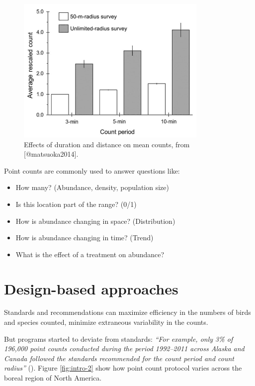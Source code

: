 \documentclass[12pt,]{book}
\providecommand{\tightlist}{%
  \setlength{\itemsep}{0pt}\setlength{\parskip}{0pt}}
\begin{document}
\begin{figure}
\includegraphics[width=0.8\linewidth]{images/matsuoka-2014-fig-2} \caption{Effects of duration and distance on mean counts, from [@matsuoka2014].}\label{fig:intro-1}
\end{figure}

Point counts are commonly used to answer questions like:

\begin{itemize}
\tightlist
\item
  How many? (Abundance, density, population size)
\item
  Is this location part of the range? (0/1)
\item
  How is abundance changing in space? (Distribution)
\item
  How is abundance changing in time? (Trend)
\item
  What is the effect of a treatment on abundance?
\end{itemize}

\hypertarget{design-based-approaches}{%
\section{Design-based approaches}\label{design-based-approaches}}

Standards and recommendations can
maximize efficiency in the numbers of birds and species counted,
minimize extraneous variability in the counts.

But programs started to deviate from standards:
\emph{``For example, only 3\% of 196,000 point counts conducted during the period
1992--2011 across Alaska and Canada followed the standards recommended for the count period and count radius''} (\citep{matsuoka2014}).
Figure \ref{fig:intro-2} show how point count protocol varies
across the boreal region of North America.
\end{document}
